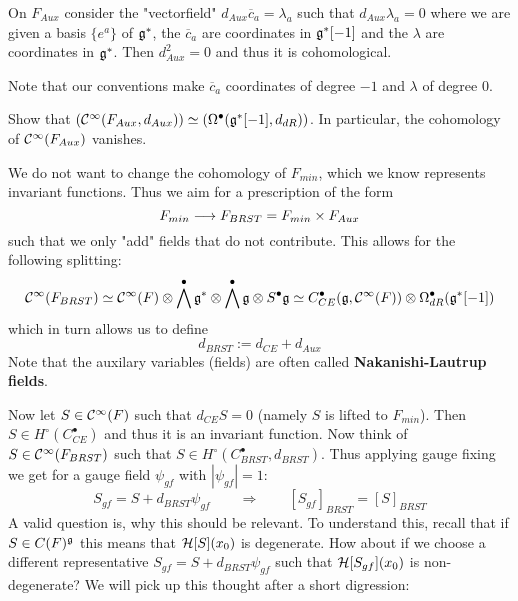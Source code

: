 \begin{lem}
  On $F_{Aux}$ consider the "vectorfield" $d_{Aux} \overline{c}_a = \lambda_a$ such that $d_{Aux} \lambda_a = 0$ where we are given a basis $\{e^a\}$ of $\mathfrak{g}^*$, the $\overline{c}_a$ are coordinates in $\mathfrak{g}^*[-1]$ and the $\lambda$ are coordinates in $\mathfrak{g}^*$. Then $d^2_{Aux} = 0$ and thus it is cohomological.
\end{lem}

Note that our conventions make $\overline{c}_a$ coordinates of degree $-1$ and $\lambda$ of degree $0$.

\begin{ex}
  Show that $\left( \mathcal{C}^{\infty}(F_{Aux}, d_{Aux}) \right) \simeq \left( \Omega^\bullet(\mathfrak{g}^*[-1], d_{dR}) \right)$. In particular, the cohomology of $\mathcal{C}^{\infty}(F_{Aux})$ vanishes.
\end{ex}

We do not want to change the cohomology of $F_{min}$, which we know represents invariant functions. Thus we aim for a prescription of the form
$$ F_{min} \longrightarrow F_{BRST} = F_{min} \times F_{Aux} $$
such that we only "add" fields that do not contribute. This allows for the following splitting:
$$ \mathcal{C}^{\infty}(F_{BRST}) \simeq \mathcal{C}^{\infty}(F) \otimes \bigwedge^\bullet \mathfrak{g}^* \otimes \bigwedge^\bullet \mathfrak{g} \otimes S^\bullet \mathfrak{g} \simeq C_{CE}^\bullet (\mathfrak{g}, \mathcal{C}^{\infty}(F)) \otimes \Omega^\bullet_{dR}(\mathfrak{g}^*[-1]) $$
which in turn allows us to define
\begin{equation}
  d_{BRST} := d_{CE} + d_{Aux}
\end{equation}
Note that the auxilary variables (fields) are often called \textbf{Nakanishi-Lautrup fields}.

Now let $S \in \mathcal{C}^{\infty}(F)$ such that $d_{CE} S = 0$ (namely $S$ is lifted to $F_{min}$). Then $S \in H^\circ (C^\bullet_{CE})$ and thus it is an invariant function. Now think of $S \in \mathcal{C}^{\infty}(F_{BRST})$ such that $S \in H^\circ(C^\bullet_{BRST}, d_{BRST})$. Thus applying gauge fixing we get for a gauge field $\psi_{gf}$ with $|\psi_{gf}| = 1$:
\begin{equation}
  S_{gf} = S + d_{BRST} \psi_{gf} \quad \quad \Longrightarrow \quad \quad  [S_{gf}]_{BRST} = [S]_{BRST}
\end{equation}
A valid question is, why this should be relevant. To understand this, recall that if $S \in C(F)^{\mathfrak{g}}$ this means that ${\mathcal{H}}[S](x_0)$ is degenerate. How about if we choose a different representative $S_{gf} = S + d_{BRST} \psi_{gf}$ such that ${\mathcal{H}}[S_{gf}](x_0)$ is non-degenerate? We will pick up this thought after a short digression:

